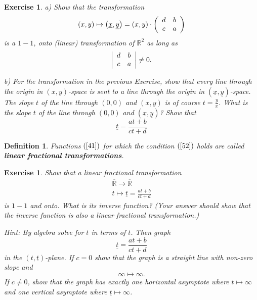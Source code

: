 \documentclass{article}%
\newtheorem{definition}[theorem]{Definition}
\newtheorem{exercise}[theorem]{Exercise}
\begin{document}
\begin{exercise}
a) Show that the transformation%
\[
\left(  x,y\right)  \mapsto\left(  \underline{x},\underline{y}\right)
=\left(  x,y\right)  \cdot\left(
\begin{array}
[c]{cc}%
d & b\\
c & a
\end{array}
\right)
\]
is a $1-1$, onto (linear) transformation of $\mathbb{R}^{2}$ as long as%
\begin{equation}
\left\vert
\begin{array}
[c]{cc}%
d & b\\
c & a
\end{array}
\right\vert \neq0. \label{52}%
\end{equation}


b) For the transformation in the previous Exercise, show that every line
through the origin in $\left(  x,y\right)  $-space is sent to a line through
the origin in $\left(  \underline{x},\underline{y}\right)  $-space. The slope
$t$ of the line through $\left(  0,0\right)  $ and $\left(  x,y\right)  $ is
of course $t=\frac{y}{x}$. What is the slope \underline{$t$} of the line
through $\left(  \underline{0},\underline{0}\right)  $ and $\left(
\underline{x},\underline{y}\right)  $? Show that%
\begin{equation}
\underline{t}=\frac{at+b}{ct+d} \label{41}%
\end{equation}

\end{exercise}

\begin{definition}
Functions $\left(  \ref{41}\right)  $ for which the condition $\left(
\ref{52}\right)  $ holds are called \textbf{linear fractional transformations}.
\end{definition}

\begin{exercise}
Show that a linear fractional transformation%
\begin{gather*}
\overline{\mathbb{R}}\rightarrow\overline{\mathbb{R}}\\
t\mapsto\underline{t}=\frac{at+b}{ct+d}%
\end{gather*}
is $1-1$ and onto. What is its inverse function? (Your answer should show that
the inverse function is also a linear fractional transformation.)

Hint: By algebra solve for $t$ in terms of \underline{$t$}. Then graph%
\[
\underline{t}=\frac{at+b}{ct+d}%
\]
in the $\left(  t,\underline{t}\right)  $-plane. If $c=0$ show that the graph
is a straight line with non-zero slope and%
\[
\infty\mapsto\infty.
\]
If $c\neq0$, show that the graph has exactly one horizontal asymptote where
$t\mapsto\infty$ and one vertical asymptote where $\underline{t}\mapsto\infty$.
\end{exercise}
\end{document}
